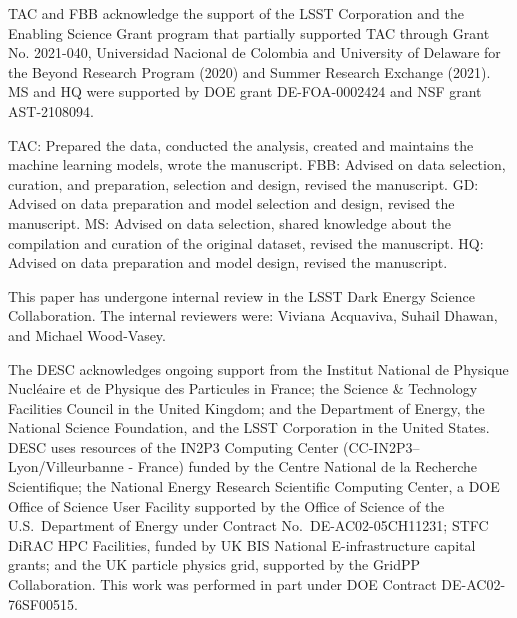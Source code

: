  
 
TAC and FBB acknowledge the support of the LSST Corporation and the Enabling Science Grant program that partially supported TAC through Grant No. 2021-040, Universidad Nacional de Colombia and University of Delaware for the Beyond Research Program (2020) and Summer Research Exchange (2021). MS and HQ were supported by DOE grant DE-FOA-0002424 and NSF grant AST-2108094. 

TAC: Prepared the data, conducted the analysis, created and maintains the machine learning models, wrote the manuscript.
FBB: Advised on data selection,  curation, and preparation,  selection and design, revised the manuscript.
GD: Advised on data preparation and model selection and design, revised the manuscript.
MS: Advised on data selection, shared knowledge about the compilation and curation of the original dataset, revised the manuscript.
HQ: Advised on data preparation and model design, revised the manuscript.


 This paper has undergone internal review in the LSST Dark Energy Science Collaboration.
 The internal reviewers were: Viviana Acquaviva, Suhail Dhawan, and Michael Wood-Vasey.
 
 
 
The DESC acknowledges ongoing support from the Institut National de 
Physique Nucl\'eaire et de Physique des Particules in France; the 
Science \& Technology Facilities Council in the United Kingdom; and the
Department of Energy, the National Science Foundation, and the LSST 
Corporation in the United States.  DESC uses resources of the IN2P3 
Computing Center (CC-IN2P3--Lyon/Villeurbanne - France) funded by the 
Centre National de la Recherche Scientifique; the National Energy 
Research Scientific Computing Center, a DOE Office of Science User 
Facility supported by the Office of Science of the U.S.\ Department of
Energy under Contract No.\ DE-AC02-05CH11231; STFC DiRAC HPC Facilities, 
funded by UK BIS National E-infrastructure capital grants; and the UK 
particle physics grid, supported by the GridPP Collaboration.  This 
work was performed in part under DOE Contract DE-AC02-76SF00515.

